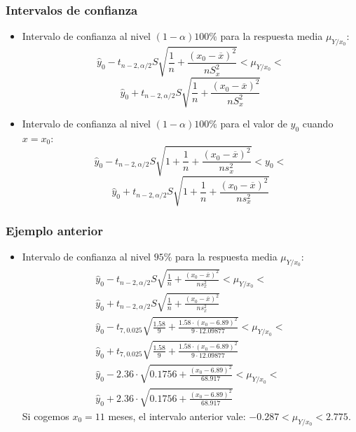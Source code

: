 \begin{frame}
\frametitle{Intervalos de confianza}
\begin{itemize}
\item<2->{Intervalo de confianza al nivel
$(1-\alpha)100\%$ para la respuesta media $\mu_{Y/x_0}$:
$$\hat{y}_0-t_{n-2,\alpha/2}S\sqrt{\frac{1}{n}+\frac{(x_0-\overline{x})^2}{n
S^2_x}}<\mu_{Y/x_0}<$$
$$\hat{y}_0+t_{n-2,\alpha/2}S\sqrt{\frac{1}{n}+\frac{(x_0-\overline{x})^2}{n
S^2_x}}$$}
\item<3->{Intervalo de confianza al nivel
$(1-\alpha)100\%$ para el valor de $y_0$ cuando $x=x_0$:
$$\hat{y}_0-t_{n-2,\alpha/2}S\sqrt{1+\frac{1}{n}+\frac{(x_0-\overline{x})^2}{n
s^2_x}}< y_0 <$$
$$\hat{y}_0+t_{n-2,\alpha/2}S\sqrt{1+\frac{1}{n}+\frac{(x_0-\overline{x})^2}{n
s^2_x}}$$}
\end{itemize}
\end{frame}

\begin{frame}
\frametitle{Ejemplo anterior}
\begin{itemize}
\item<2->{Intervalo de confianza al nivel $95\%$ para la respuesta media $\mu_{Y/x_0}$:
$$
\begin{array}{l}
\hat{y}_0-t_{n-2,\alpha/2}S\sqrt{\frac{1}{n}+\frac{(x_0-\overline{x})^2}{n
s^2_x}}<\mu_{Y/x_0}< \\
\hat{y}_0+t_{n-2,\alpha/2}S\sqrt{\frac{1}{n}+\frac{(x_0-\overline{x})^2}{n
s^2_x}} \\
\hat{y}_0 - t_{7,0.025} \sqrt{\frac{1.58}{9}+\frac{1.58\cdot (x_0 - 6.89)^2}{9\cdot 12.09877}}<\mu_{Y/x_0}< \\
\hat{y}_0 + t_{7,0.025} \sqrt{\frac{1.58}{9} +\frac{1.58\cdot (x_0 - 6.89)^2}{9\cdot 12.09877}} \\
\hat{y}_0 - 2.36\cdot  \sqrt{0.1756 +\frac{(x_0 - 6.89)^2}{68.917}} <\mu_{Y/x_0}< \\
\hat{y}_0 + 2.36\cdot  \sqrt{0.1756 +\frac{(x_0 - 6.89)^2}{68.917}}
\end{array}
$$
Si cogemos $x_0=11$ meses, el intervalo anterior vale: $-0.287<\mu_{Y/x_0}< 2.775.$}
\end{itemize}

\end{frame}

